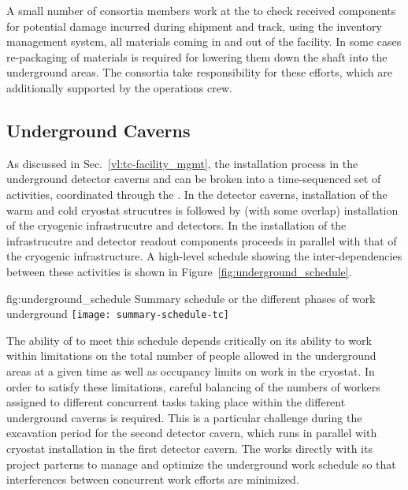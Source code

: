 A small number of  consortia members work at
the  to check received components for potential damage 
incurred during shipment and track, using the inventory management 
system, all materials coming in and out of the facility.  In some 
cases re-packaging of materials is required for lowering them down
the shaft into the underground areas.  The  consortia
take responsibility for these efforts, which are additionally
supported by the  operations crew.   

\subsection{Underground Caverns}

As discussed in Sec.~\ref{vl:tc-facility_mgmt}, the installation 
process in the underground detector caverns and  can 
be broken into a time-sequenced set of activities, coordinated 
through the .  In the detector caverns, installation 
of the warm and cold cryostat strucutres is followed by (with 
some overlap) installation of the cryogenic infrastrucutre and 
detectors.  In the  installation of the   
infrastrucutre and detector readout components proceeds in 
parallel with that of the cryogenic infrastructure.  A high-level 
schedule showing the inter-dependencies between these activities 
is shown in Figure~\ref{fig:underground_schedule}.
\begin{dunefigure}{fig:underground_schedule}
  {Summary schedule or the different phases of work underground}
  \texttt{[image: summary-schedule-tc]}
\end{dunefigure}

The ability of  to meet this schedule depends
critically on its ability to work within limitations on the total
number of people allowed in the underground areas at a given time as
well as occupancy limits on work in the cryostat.  In order to satisfy
these limitations, careful balancing of the numbers of workers
assigned to different concurrent tasks taking place within the
different underground caverns is required.  This is a particular
challenge during the excavation period for the second detector cavern,
which runs in parallel with cryostat installation in the first
detector cavern.  The  works directly with its
 project parterns to manage and optimize the
underground work schedule so that interferences between concurrent
work efforts are minimized.

